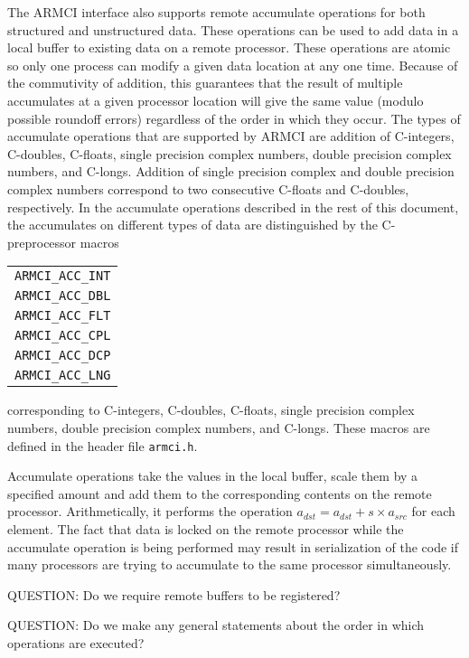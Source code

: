 \documentclass[12pt]{article}
\begin{document}
The ARMCI interface also supports remote accumulate operations for both
structured and unstructured data. These operations can be used to add data in a
local buffer to existing data on a remote processor. These operations are atomic
so only one process can modify a given data location at any one time. Because of
the commutivity of addition, this guarantees that the result of multiple
accumulates at a given processor location will give the same value (modulo
possible roundoff errors) regardless of the order in which they occur. The types
of accumulate operations that are supported
by ARMCI are addition of C-integers, C-doubles, C-floats, single precision
complex numbers, double precision complex numbers, and C-longs. Addition of
single precision complex and double precision complex numbers correspond to two
consecutive C-floats and C-doubles, respectively. In the accumulate operations
described in the rest of this document, the accumulates on different types
of data are distinguished by the C-preprocessor macros
\newline
\begin{center}
\begin{tabular}{l}
\texttt{ARMCI\_ACC\_INT} \\
\texttt{ARMCI\_ACC\_DBL} \\
\texttt{ARMCI\_ACC\_FLT} \\
\texttt{ARMCI\_ACC\_CPL} \\
\texttt{ARMCI\_ACC\_DCP} \\
\texttt{ARMCI\_ACC\_LNG}
\end{tabular}
\newline
\end{center}
corresponding
to C-integers, C-doubles, C-floats, single precision complex numbers, double
precision complex numbers, and C-longs. These macros are defined in the header
file \texttt{armci.h}.

Accumulate operations take the values in the local buffer, scale them by a
specified amount and add them to the corresponding contents on the remote
processor. Arithmetically, it performs the operation
$a_{dst} = a_{dst} + s\times a_{src}$ for each element. The fact that data is
locked on the remote processor while the accumulate operation is being performed
may result in serialization of the code if many processors are trying to
accumulate to the same processor simultaneously.


QUESTION: Do we require remote buffers to be registered?

QUESTION: Do we make any general statements about the order in which operations
are executed?
\end{document}
